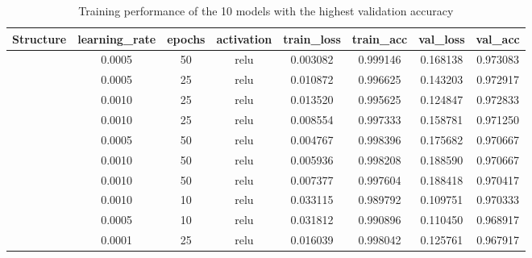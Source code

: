 \documentclass[a4paper]{article}
\begin{document}
\begin{table}[h!]
    \centering
    \caption{Training performance of the 10 models with the highest validation accuracy}
    \label{tab:ann_performance_top10_validation_accuracy}
    \begin{tabular}{|| c c c c | c c c c ||}
  
    \hline
    \centering
    \textbf{Structure}  &\textbf{learning\_rate} &\textbf{epochs}    &\textbf{activation}    & \textbf{train\_loss}   &\textbf{train\_acc} &\textbf{val\_loss}  &\textbf{val\_acc} \\
    \hline \hline
    [64,32,16]          & 0.0005                & 50                & relu                  & 0.003082              & 0.999146          &0.168138           & 0.973083 \\ 
    \hline
    [64,32,16]          & 0.0005                & 25                & relu                  & 0.010872              & 0.996625          &0.143203           & 0.972917 \\ 
    \hline
    [64,32,16]          & 0.0010                & 25                & relu                  & 0.013520              & 0.995625          &0.124847           & 0.972833 \\ 
    \hline
    [64,32]             & 0.0010                & 25                & relu                  & 0.008554              & 0.997333          &0.158781           & 0.971250 \\ 
    \hline
    [64,32]             & 0.0005                & 50                & relu                  & 0.004767              & 0.998396          &0.175682           & 0.970667 \\ 
    \hline
    [64,32]             & 0.0010                & 50                & relu                  & 0.005936              & 0.998208          &0.188590           & 0.970667 \\ 
    \hline
    [64,32,16]          & 0.0010                & 50                & relu                  & 0.007377              & 0.997604          &0.188418           & 0.970417 \\ 
    \hline
    [64,32]             & 0.0010                & 10                & relu                  & 0.033115              & 0.989792          &0.109751           & 0.970333 \\ 
    \hline
    [64,32]             & 0.0005                & 10                & relu                  & 0.031812              & 0.990896          &0.110450           & 0.968917 \\ 
    \hline
    [64,32]             & 0.0001                & 25                & relu                  & 0.016039              & 0.998042          &0.125761           & 0.967917 \\ 
    \hline
    \end{tabular}
\end{table}
\end{document}
